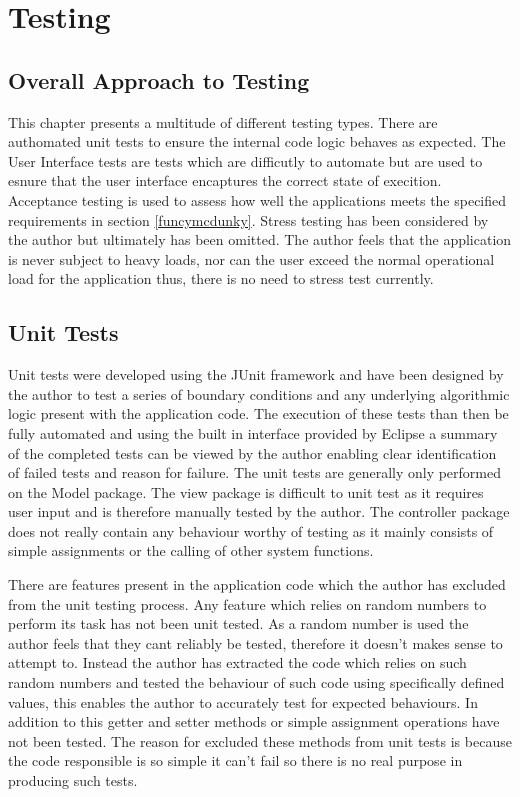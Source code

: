 \chapter{Testing}

\section{Overall Approach to Testing}

This chapter presents a multitude of different testing types. There are authomated unit tests to ensure the internal code logic behaves as expected. The User Interface tests are tests which are difficutly to automate but are used to esnure that the user interface encaptures the correct state of execition. Acceptance testing is used to assess how well the applications meets the specified requirements in section \ref{funcymcdunky}. Stress testing has been considered by the author but ultimately has been omitted. The author feels that the application is never subject to heavy loads, nor can the user exceed the normal operational load for the application thus, there is no need to stress test currently.

\section{Unit Tests}

Unit tests were developed using the JUnit framework and have been designed by the author to test a series of boundary conditions and any underlying algorithmic logic present with the application code. The execution of these tests than then be fully automated and using the built in interface provided by Eclipse a summary of the completed tests can be viewed by the author enabling clear identification of failed tests and reason for failure. The unit tests are generally only performed on the Model package. The view package is difficult to unit test as it requires user input and is therefore manually tested by the author. The controller package does not really contain any behaviour worthy of testing as it mainly consists of simple assignments or the calling of other system functions.

There are features present in the application code which the author has excluded from the unit testing process. Any feature which relies on random numbers to perform its task has not been unit tested. As a random number is used the author feels that they cant reliably be tested, therefore it doesn’t makes sense to attempt to. Instead the author has extracted the code which relies on such random numbers and tested the behaviour of such code using specifically defined values, this enables the author to accurately test for expected behaviours. In addition to this getter and setter methods or simple assignment operations have not been tested. The reason for excluded these methods from unit tests is because the code responsible is so simple it can’t fail so there is no real purpose in producing such tests.

